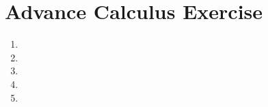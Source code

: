 


\cfoot{\thepage} %

\section*{Advance Calculus Exercise}
 
 \begin{enumerate}[wide,label = $\arabic* .$]
   \item 
   \item 
   \newpage
   \item 
   \item 
   \newpage
   \item 
   
   
   
 \end{enumerate}

